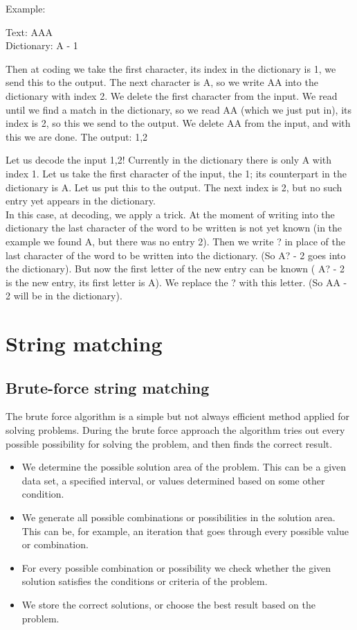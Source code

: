 \documentclass[margin=0px]{article}
\begin{document}
\begin{description}
        Example:

        Text: AAA\\
        Dictionary: A - 1

        Then at coding we take the first character, its index in the dictionary is 1, we send this to the output. The next character is A, so we write AA into the dictionary with index 2. We delete the first character from the input. We read until we find a match in the dictionary, so we read AA (which we just put in), its index is 2, so this we send to the output. We delete AA from the input, and with this we are done. The output: 1,2

        Let us decode the input 1,2! Currently in the dictionary there is only A with index 1. Let us take the first character of the input, the 1; its counterpart in the dictionary is A. Let us put this to the output. The next index is 2, but no such entry yet appears in the dictionary. \\

        In this case, at decoding, we apply a trick. At the moment of writing into the dictionary the last character of the word to be written is not yet known (in the example we found A, but there was no entry 2). Then we write ? in place of the last character of the word to be written into the dictionary. (So A? - 2 goes into the dictionary). But now the first letter of the new entry can be known ( A? - 2 is the new entry, its first letter is A). We replace the ? with this letter. (So AA - 2 will be in the dictionary).
\end{description}
\section{String matching}
\subsection{Brute-force string matching}
The brute force algorithm is a simple but not always efficient method applied for solving problems. During the brute force approach the algorithm tries out every possible possibility for solving the problem, and then finds the correct result.

\begin{itemize}
    \item We determine the possible solution area of the problem. This can be a given data set, a specified interval, or values determined based on some other condition.
    \item We generate all possible combinations or possibilities in the solution area. This can be, for example, an iteration that goes through every possible value or combination.
    \item For every possible combination or possibility we check whether the given solution satisfies the conditions or criteria of the problem.
    \item We store the correct solutions, or choose the best result based on the problem.
\end{itemize}
\end{document}
